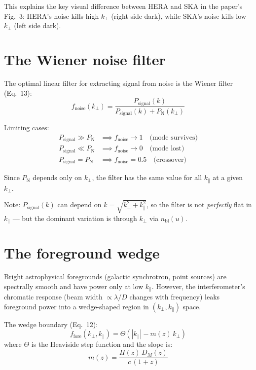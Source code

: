 \documentclass[11pt,a4paper]{article}
\newcommand{\kperp}{k_\perp}
\newcommand{\kpar}{k_\parallel}
\newcommand{\Pnoise}{P_\mathrm{N}}
\newcommand{\Psignal}{P_\mathrm{signal}}
\newcommand{\fnoise}{f_\mathrm{noise}}
\newcommand{\ffore}{f_\mathrm{fore}}
\newcommand{\nbl}{n_\mathrm{bl}}
\begin{document}
This explains the key visual difference between HERA and SKA in the paper's Fig.~3: HERA's noise kills high $\kperp$ (right side dark), while SKA's noise kills low $\kperp$ (left side dark).

\section{The Wiener noise filter}

The optimal linear filter for extracting signal from noise is the Wiener filter (Eq.~13):
\begin{equation}\label{eq:wiener}
    \boxed{
    \fnoise(\kperp) = \frac{\Psignal(k)}{\Psignal(k) + \Pnoise(\kperp)}
    }
\end{equation}

Limiting cases:
\begin{align}
    \Psignal \gg \Pnoise &\implies \fnoise \to 1 \quad \text{(mode survives)} \\
    \Psignal \ll \Pnoise &\implies \fnoise \to 0 \quad \text{(mode lost)} \\
    \Psignal = \Pnoise &\implies \fnoise = 0.5 \quad \text{(crossover)}
\end{align}

Since $\Pnoise$ depends only on $\kperp$, the filter has the same value for all $\kpar$ at a given $\kperp$.

Note: $\Psignal(k)$ can depend on $k = \sqrt{\kperp^2 + \kpar^2}$, so the filter is not \emph{perfectly} flat in $\kpar$ --- but the dominant variation is through $\kperp$ via $\nbl(u)$.

\section{The foreground wedge}

Bright astrophysical foregrounds (galactic synchrotron, point sources) are spectrally smooth and have power only at low $\kpar$. However, the interferometer's chromatic response (beam width $\propto \lambda/D$ changes with frequency) leaks foreground power into a wedge-shaped region in $(\kperp, \kpar)$ space.

The wedge boundary (Eq.~12):
\begin{equation}\label{eq:wedge}
    \boxed{
    \ffore(\kperp, \kpar) = \Theta\!\left(|\kpar| - m(z)\,\kperp\right)
    }
\end{equation}
where $\Theta$ is the Heaviside step function and the slope is:
\begin{equation}
    m(z) = \frac{H(z)\,D_M(z)}{c\,(1+z)}
\end{equation}
\end{document}
